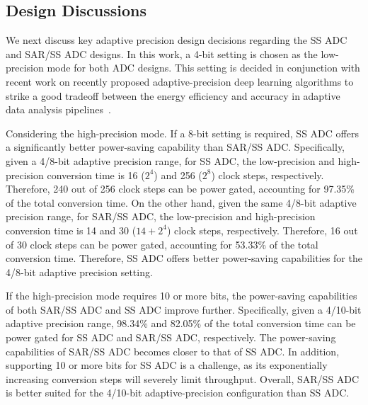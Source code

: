 \subsection{Design Discussions}\label{discussion}

We next discuss key adaptive precision design decisions regarding the SS ADC and SAR/SS ADC designs. 
In this work, a 4-bit setting is chosen as the low-precision mode for both ADC designs. This 
setting is decided in conjunction with recent work on recently proposed adaptive-precision deep learning algorithms 
to strike a good tradeoff between the energy efficiency and accuracy in adaptive data analysis 
pipelines~\cite{leibe_xnor-net_2016,li_ternary_2016,park_energy-efficient_2018}. 


Considering the high-precision mode. If a 8-bit setting is required, SS ADC offers a significantly better power-saving
capability than SAR/SS ADC. Specifically, given a 4/8-bit adaptive precision range, for SS ADC, the 
low-precision and high-precision conversion time is 16 ($2^4$) and 256 ($2^8$) clock steps, respectively. Therefore, 
240 out of 256 clock steps can be power gated, accounting for 97.35\% of the total conversion time.  
On the other hand, given the same 4/8-bit adaptive precision range, for SAR/SS ADC, the low-precision and 
high-precision conversion time is 14 and 30 ($14+2^4$) clock steps, respectively. Therefore, 16 out of 30 clock steps 
can be power gated, accounting for 53.33\% of the total conversion time. Therefore, SS ADC offers better power-saving
capabilities for the 4/8-bit adaptive precision setting. 

If the high-precision mode requires 10 or more bits, the power-saving capabilities of both SAR/SS 
ADC and SS ADC improve further. Specifically, given a 4/10-bit adaptive precision range, 98.34\% and 82.05\% of the 
total conversion time can be power gated for SS ADC and SAR/SS ADC, respectively. The power-saving capabilities of 
SAR/SS ADC becomes closer to that of SS ADC. In addition, supporting 10 or more bits for SS ADC is a challenge, as 
its exponentially increasing conversion steps will severely limit throughput. 
Overall, SAR/SS ADC is better suited for the 4/10-bit adaptive-precision configuration than SS ADC.

